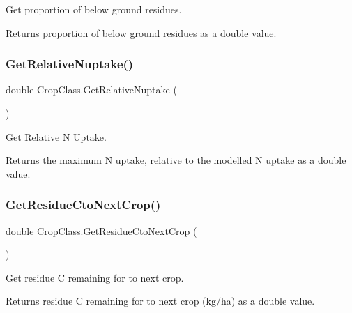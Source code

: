 Get proportion of below ground residues. 

\begin{DoxyReturn}{Returns}
proportion of below ground residues as a double value. 
\end{DoxyReturn}
\mbox{\label{class_crop_class_ad636f411f04fe154b85e96d254a60bf7}} 
\subsubsection{\texorpdfstring{GetRelativeNuptake()}{GetRelativeNuptake()}}
{\footnotesize\ttfamily double Crop\+Class.\+Get\+Relative\+Nuptake (\begin{DoxyParamCaption}{ }\end{DoxyParamCaption})\hspace{0.3cm}{\ttfamily [inline]}}



Get Relative N Uptake. 

\begin{DoxyReturn}{Returns}
the maximum N uptake, relative to the modelled N uptake as a double value. 
\end{DoxyReturn}
\mbox{\label{class_crop_class_aaaeda0fc097e4a1d036763d1c8b7f18e}} 
\subsubsection{\texorpdfstring{GetResidueCtoNextCrop()}{GetResidueCtoNextCrop()}}
{\footnotesize\ttfamily double Crop\+Class.\+Get\+Residue\+Cto\+Next\+Crop (\begin{DoxyParamCaption}{ }\end{DoxyParamCaption})\hspace{0.3cm}{\ttfamily [inline]}}



Get residue C remaining for to next crop. 

\begin{DoxyReturn}{Returns}
residue C remaining for to next crop (kg/ha) as a double value. 
\end{DoxyReturn}
\mbox{\label{class_crop_class_a30f491fdf15f7729bb8497b703c43be2}} 
